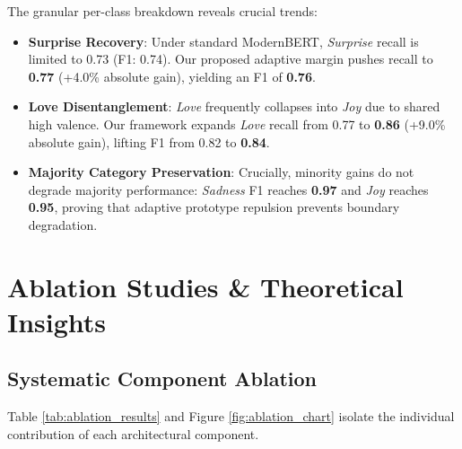 \documentclass[journal,twocolumn]{article}
\begin{document}
The granular per-class breakdown reveals crucial trends:
\begin{itemize}
    \item \textbf{Surprise Recovery}: Under standard ModernBERT, \textit{Surprise} recall is limited to 0.73 (F1: 0.74). Our proposed adaptive margin pushes recall to \textbf{0.77} (+4.0\% absolute gain), yielding an F1 of \textbf{0.76}.
    \item \textbf{Love Disentanglement}: \textit{Love} frequently collapses into \textit{Joy} due to shared high valence. Our framework expands \textit{Love} recall from 0.77 to \textbf{0.86} (+9.0\% absolute gain), lifting F1 from 0.82 to \textbf{0.84}.
    \item \textbf{Majority Category Preservation}: Crucially, minority gains do not degrade majority performance: \textit{Sadness} F1 reaches \textbf{0.97} and \textit{Joy} reaches \textbf{0.95}, proving that adaptive prototype repulsion prevents boundary degradation.
\end{itemize}

\section{Ablation Studies \& Theoretical Insights}
\label{sec:ablation}

\subsection{Systematic Component Ablation}
Table \ref{tab:ablation_results} and Figure \ref{fig:ablation_chart} isolate the individual contribution of each architectural component.

\begin{table}[t]
\centering
\caption{Ablation Analysis on Test Set ($N=2,000$).}
\label{tab:ablation_results}
\end{table}
\end{document}
